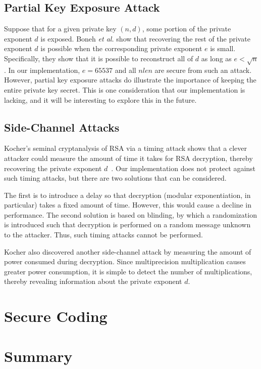 \documentclass[a4paper]{article}
\begin{document}
\subsection{Partial Key Exposure Attack}

Suppose that for a given private key $(n,d)$, some portion of the private exponent $d$ is exposed. Boneh \emph{et al.} show that recovering the rest of the private exponent $d$ is possible when the corresponding private exponent $e$ is small. Specifically, they show that it is possible to reconstruct all of $d$ as long as $e < \sqrt{n}$. In our implementation, $e = 65537$ and all $nlen$ are secure from such an attack. However, partial key exposure attacks do illustrate the importance
of keeping the entire private key secret. This is one consideration that our implementation is lacking, and it will be interesting to explore this in the future.

\subsection{Side-Channel Attacks}

Kocher's seminal cryptanalysis of RSA via a timing attack shows that a clever attacker could measure the amount of time it takes for RSA decryption, thereby recovering the private exponent $d$~\cite{kocher1996timing}. Our implementation does not protect against such timing attacks, but there are two solutions that can be considered.

The first is to introduce a delay so that decryption (modular exponentiation, in particular) takes a fixed amount of time. However, this would cause a decline in performance. The second solution is based on blinding, by which a randomization is introduced such that decryption is performed on a random message unknown to the attacker. Thus, such timing attacks cannot be performed.

Kocher also discovered another side-channel attack by measuring the amount of power consumed during decryption. Since multiprecision multiplication causes greater power consumption, it is simple to detect the number of multiplications, thereby revealing information about the private exponent $d$. 

\section{Secure Coding}


\section{Summary}
\end{document}
